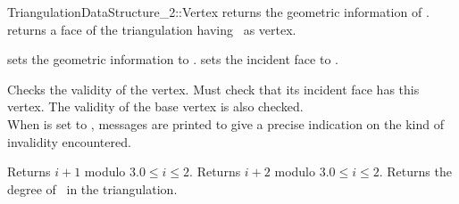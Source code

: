 \begin{ccRefConcept}{TriangulationDataStructure_2::Vertex}
{returns  the geometric information of \ccVar.}
\ccGlue
{}
{returns a face of the triangulation having  \ccVar\ as vertex.}

\begin{ccAdvanced}

{sets the geometric information to .}
\ccGlue
{}
{sets the incident face to .}

\end{ccAdvanced}


{Checks the validity of the vertex. Must check that its incident face
has this vertex. The validity of the base vertex is also checked.\\
When  is set to , messages are printed to give
a precise indication on the kind of invalidity encountered.}


{Returns $i+1$ modulo 3.\ccPrecond $0\leq i \leq 2$.}
\ccGlue
{}
{Returns $i+2$ modulo 3.\ccPrecond $0\leq i \leq 2$.}
\ccGlue
{}
{Returns the degree of \ccVar\ in the triangulation.}


\ccHasModels
{}


\ccSeeAlso
{} \\
 \\

\end{ccRefConcept}


